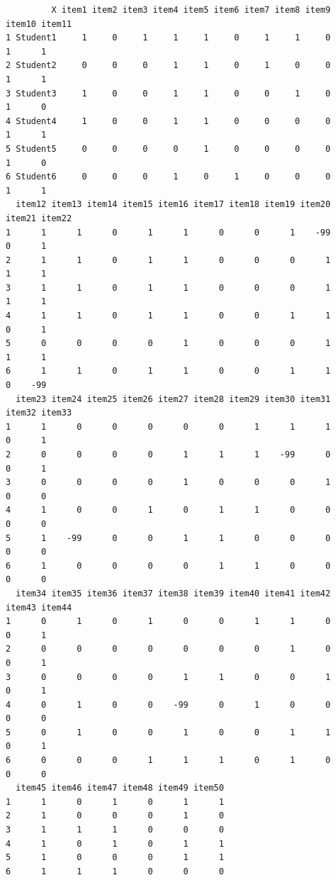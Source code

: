 \documentclass[
  a4paper,
]{ltjsbook}
\begin{document}
\begin{verbatim}
         X item1 item2 item3 item4 item5 item6 item7 item8 item9 item10 item11
1 Student1     1     0     1     1     1     0     1     1     0      1      1
2 Student2     0     0     0     1     1     0     1     0     0      1      1
3 Student3     1     0     0     1     1     0     0     1     0      1      0
4 Student4     1     0     0     1     1     0     0     0     0      1      1
5 Student5     0     0     0     0     1     0     0     0     0      1      0
6 Student6     0     0     0     1     0     1     0     0     0      1      1
  item12 item13 item14 item15 item16 item17 item18 item19 item20 item21 item22
1      1      1      0      1      1      0      0      1    -99      0      1
2      1      1      0      1      1      0      0      0      1      1      1
3      1      1      0      1      1      0      0      0      1      1      1
4      1      1      0      1      1      0      0      1      1      0      1
5      0      0      0      0      1      0      0      0      1      1      1
6      1      1      0      1      1      0      0      1      1      0    -99
  item23 item24 item25 item26 item27 item28 item29 item30 item31 item32 item33
1      1      0      0      0      0      0      1      1      1      0      1
2      0      0      0      0      1      1      1    -99      0      0      1
3      0      0      0      0      1      0      0      0      1      0      0
4      1      0      0      1      0      1      1      0      0      0      0
5      1    -99      0      0      1      1      0      0      0      0      0
6      1      0      0      0      0      1      1      0      0      0      0
  item34 item35 item36 item37 item38 item39 item40 item41 item42 item43 item44
1      0      1      0      1      0      0      1      1      0      0      1
2      0      0      0      0      0      0      0      1      0      0      1
3      0      0      0      0      1      1      0      0      1      0      1
4      0      1      0      0    -99      0      1      0      0      0      0
5      0      1      0      0      1      0      0      1      1      0      1
6      0      0      0      1      1      1      0      1      0      0      0
  item45 item46 item47 item48 item49 item50
1      1      0      1      0      1      1
2      1      0      0      0      1      0
3      1      1      1      0      0      0
4      1      0      1      0      1      1
5      1      0      0      0      1      1
6      1      1      1      0      0      0
\end{verbatim}
\end{document}
